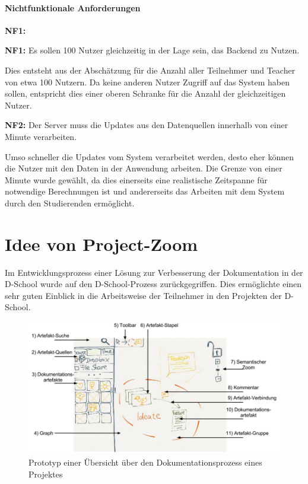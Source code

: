 \paragraph{Nichtfunktionale Anforderungen}
\label{sec:nonfunctional}

\begin{labeling}{\textbf{NF1:}}
  \item[\textbf{NF1:}] Es sollen 100 Nutzer gleichzeitig in der Lage sein, das Backend zu Nutzen.

  Dies entsteht aus der Abschätzung für die Anzahl aller Teilnehmer und Teacher von etwa 100 Nutzern. Da keine anderen Nutzer Zugriff auf das System haben sollen, entspricht dies einer oberen Schranke für die Anzahl der gleichzeitigen Nutzer. 

  \item[\textbf{NF2:}]  Der Server muss die Updates aus den Datenquellen innerhalb von einer Minute verarbeiten.

  Umso schneller die Updates vom System verarbeitet werden, desto eher können die Nutzer mit den Daten in der Anwendung arbeiten. Die Grenze von einer Minute wurde gewählt, da dies einerseits eine realistische Zeitspanne für notwendige Berechnungen ist und andererseits das Arbeiten mit dem System durch den Studierenden ermöglicht.
\end{labeling}


\section{Idee von Project-Zoom}
 
Im Entwicklungsprozess einer Lösung zur Verbesserung der Dokumentation in der D-School wurde auf den D-School-Prozess zurückgegriffen. Dies ermöglichte einen sehr guten Einblick in die Arbeitsweise der Teilnehmer in den Projekten der D-School. 

\begin{figure}[h]  
  \centering     
  \includegraphics[width=1.0\textwidth]{img/projectzoom_prototype.png}  
   \caption{Prototyp einer Übersicht über den Dokumentationsprozess eines Projektes}
  \label{fig:projectzoom_prototype} 
\end{figure}

